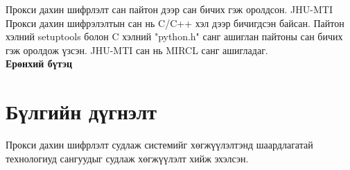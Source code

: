 Прокси дахин шифрлэлт сан пайтон дээр сан бичих гэж оролдсон. JHU-MTI Прокси дахин шифрэлэлтын сан нь C/C++ хэл дээр бичигдсэн байсан. Пайтон хэлний setuptools болон C хэлний "python.h" санг ашиглан пайтоны сан бичих гэж оролдож үзсэн. JHU-MTI сан нь MIRCL санг ашигладаг.
\\
\textbf{Ерөнхий бүтэц}


\section{Бүлгийн дүгнэлт}
Прокси дахин шифрлэлт судлаж системийг хөгжүүлэлтэнд шаардлагатай технологиуд сангуудыг судлаж хөгжүүлэлт хийж эхэлсэн.